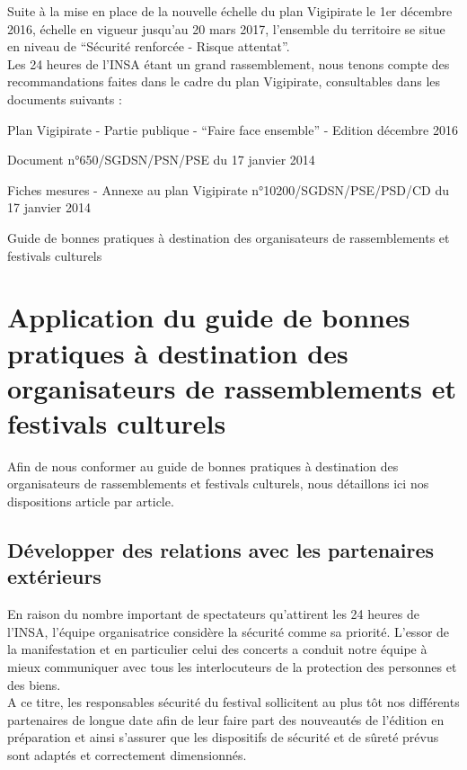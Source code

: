 \documentclass[hidelinks, paper=a4, fontsize=13pt]{report}
\begin{document}
Suite à la mise en place de la nouvelle échelle du plan Vigipirate le 1er décembre 2016, échelle en vigueur jusqu’au 20 mars 2017, l'ensemble du territoire se situe en niveau de “Sécurité renforcée - Risque attentat”.\\

Les 24 heures de l’INSA étant un grand rassemblement, nous tenons compte des recommandations faites dans le cadre du plan Vigipirate, consultables dans les documents suivants :
\begin{list}{•}{}
	\item Plan Vigipirate - Partie publique - “Faire face ensemble” - Edition décembre 2016
	\item Document n°650/SGDSN/PSN/PSE du 17 janvier 2014
	\item Fiches mesures - Annexe au plan Vigipirate n°10200/SGDSN/PSE/PSD/CD du 17 janvier 2014
	\item Guide de bonnes pratiques à destination des organisateurs de rassemblements et festivals culturels
\end{list}

\section{Application du guide de bonnes pratiques à destination des organisateurs de rassemblements et festivals culturels}

Afin de nous conformer au guide de bonnes pratiques à destination des organisateurs de rassemblements et festivals culturels, nous détaillons ici nos dispositions article par article.

\subsection{Développer des relations avec les partenaires extérieurs}

En raison du nombre important de spectateurs qu'attirent les 24 heures de l'INSA, l'équipe organisatrice considère la sécurité comme sa priorité. L'essor de la manifestation et en particulier celui des concerts a conduit notre équipe à mieux communiquer avec tous les interlocuteurs de la protection des personnes et des biens.\\

A ce titre, les responsables sécurité du festival sollicitent au plus tôt nos différents partenaires de longue date afin de leur faire part des nouveautés de l’édition en préparation et ainsi s’assurer que les dispositifs de sécurité et de sûreté prévus sont adaptés et correctement dimensionnés.\\
\end{document}
